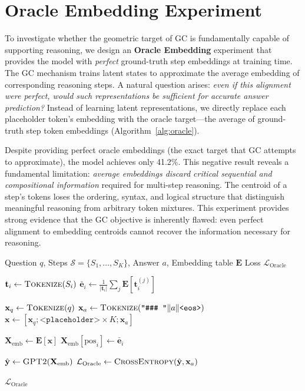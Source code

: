 \section{Oracle Embedding Experiment}
\label{app:oracle_embedding}

To investigate whether the geometric target of GC is fundamentally capable of supporting reasoning, we design an \textbf{Oracle Embedding} experiment that provides the model with \textit{perfect} ground-truth step embeddings at training time.
The GC mechanism trains latent states to approximate the average embedding of corresponding reasoning steps. A natural question arises: \textit{even if this alignment were perfect, would such representations be sufficient for accurate answer prediction?}
Instead of learning latent representations, we directly replace each placeholder token's embedding with the oracle target—the average of ground-truth step token embeddings (Algorithm~\ref{alg:oracle}).

Despite providing perfect oracle embeddings (the exact target that GC attempts to approximate), the model achieves only 41.2\%. This negative result reveals a fundamental limitation: \textit{average embeddings discard critical sequential and compositional information} required for multi-step reasoning. The centroid of a step's tokens loses the ordering, syntax, and logical structure that distinguish meaningful reasoning from arbitrary token mixtures.
This experiment provides strong evidence that the GC objective is inherently flawed: even perfect alignment to embedding centroids cannot recover the information necessary for reasoning. 

\begin{algorithm}[h]
\footnotesize
\caption{Oracle Embedding Experiment (Upper Bound for GC)}
\label{alg:oracle}
\begin{algorithmic}[1]
 Question $q$, Steps $\mathcal{S} = \{S_1, \ldots, S_K\}$, Answer $a$, Embedding table $\mathbf{E}$
 Loss $\mathcal{L}_{\text{Oracle}}$

\STATE
{}
    \STATE $\mathbf{t}_i \gets \textsc{Tokenize}(S_i)$
    \STATE $\bar{\mathbf{e}}_i \gets \frac{1}{|\mathbf{t}_i|} \sum_{j} \mathbf{E}[\mathbf{t}_i^{(j)}]$ 
\ENDFOR

\STATE
\STATE $\mathbf{x}_q \gets \textsc{Tokenize}(q)$
\STATE $\mathbf{x}_a \gets \textsc{Tokenize}(\texttt{"\#\#\# "} \| a \| \texttt{<eos>})$
\STATE $\mathbf{x} \gets [\mathbf{x}_q; \texttt{<placeholder>} \times K; \mathbf{x}_a]$

\STATE
\STATE $\mathbf{X}_{\text{emb}} \gets \mathbf{E}[\mathbf{x}]$
    \STATE $\mathbf{X}_{\text{emb}}[\text{pos}_i] \gets \bar{\mathbf{e}}_i$
\ENDFOR

\STATE
\STATE $\hat{\mathbf{y}} \gets \textsc{GPT2}(\mathbf{X}_{\text{emb}})$
\STATE $\mathcal{L}_{\text{Oracle}} \gets \textsc{CrossEntropy}(\hat{\mathbf{y}}, \mathbf{x}_a)$ 

 $\mathcal{L}_{\text{Oracle}}$
\end{algorithmic}
\end{algorithm}